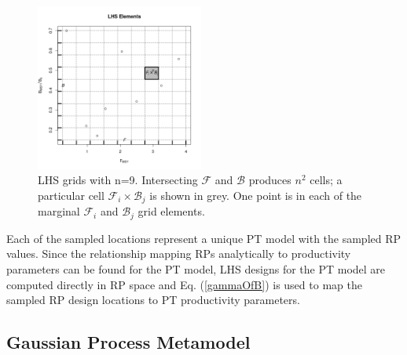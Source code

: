 %
\begin{figure}
\vspace{-1cm}
\includegraphics[width=0.49\textwidth]{../gpBias/designGrid.png}
\vspace{-0.5cm}
\caption{ LHS grids with n=9. Intersecting $\mathcal{F}$ and $\mathcal{B}$ produces $n^2$
cells; a particular cell $\mathcal{F}_i\times\mathcal{B}_j$ is shown in grey.
One point is in each of the marginal $\mathcal{F}_i$ and $\mathcal{B}_j$ grid
elements. \label{LHS}
}
\end{figure}

%
Each of the sampled locations represent a unique PT model with the sampled RP 
values. Since the relationship mapping RPs analytically to productivity
parameters can be found for the PT model, LHS designs for the PT model are 
computed directly in RP space and Eq. (\ref{gammaOfB}) is used to map the
sampled RP design locations to PT productivity parameters.
\\

%
\subsection{Gaussian Process Metamodel\label{gpmm}}
%



